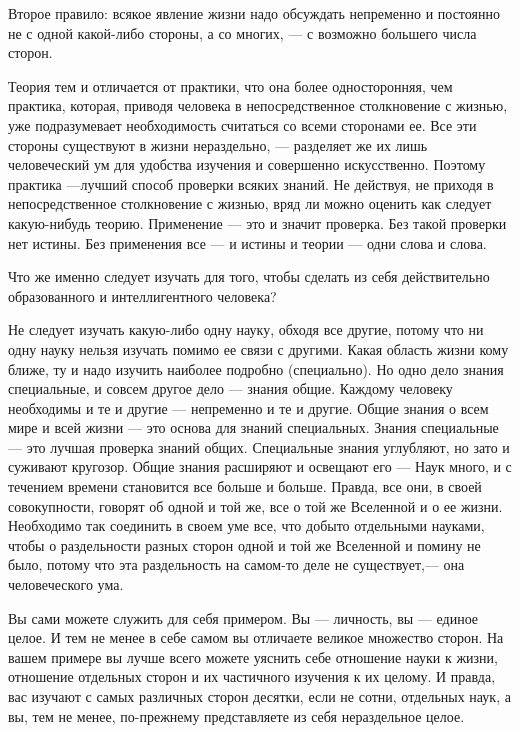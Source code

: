 Второе правило: всякое явление жизни надо обсуждать непременно и постоянно не с одной какой-либо стороны, а со многих, --- с возможно большего числа сторон.

Теория тем и отличается от практики, что она более односторонняя, чем практика, которая, приводя человека в непосредственное столкновение с жизнью, уже подразумевает необходимость считаться со всеми сторонами ее. Все эти стороны существуют в жизни нераздельно, --- разделяет же их лишь человеческий ум для удобства изучения и  совершенно искусственно. Поэтому практика —лучший способ проверки всяких знаний. Не действуя, не приходя в непосредственное столкновение с жизнью, вряд ли можно оценить как следует какую-нибудь теорию. Применение --- это и значит проверка. Без такой проверки нет истины. Без применения все --- и истины и теории --- одни слова и слова.

Что же именно следует изучать для того, чтобы сделать из себя действительно образованного и интеллигентного человека?

Не следует изучать какую-либо одну науку, обходя все другие, потому что ни одну науку нельзя изучать помимо ее связи с другими. Какая область жизни кому ближе, ту и надо изучить наиболее подробно (специально). Но одно дело знания специальные, и совсем другое дело --- знания общие. Каждому человеку необходимы и те и другие --- непременно и те и другие. Общие знания о всем мире и всей жизни --- это основа для знаний специальных. Знания специальные --- это лучшая проверка знаний общих. Специальные знания углубляют, но зато и суживают кругозор. Общие знания расширяют и освещают его ---
Наук много, и с течением времени становится все больше и больше. Правда, все они, в своей совокупности, говорят об одной и той же, все о той же Вселенной и о ее жизни. Необходимо так соединить в своем уме все, что добыто отдельными науками, чтобы о раздельности разных сторон одной и той же Вселенной и помину не было, потому что эта раздельность на самом-то деле не существует,--- она  человеческого ума.


Вы сами можете служить для себя примером. Вы --- личность, вы --- единое целое. И тем не менее в себе самом вы отличаете великое множество сторон. На вашем примере вы лучше всего можете уяснить себе отношение науки к жизни, отношение отдельных сторон и их частичного изучения к их целому. И правда, вас изучают с самых различных сторон десятки, если не сотни, отдельных наук, а вы, тем не менее, по-прежнему представляете из себя нераздельное целое.

